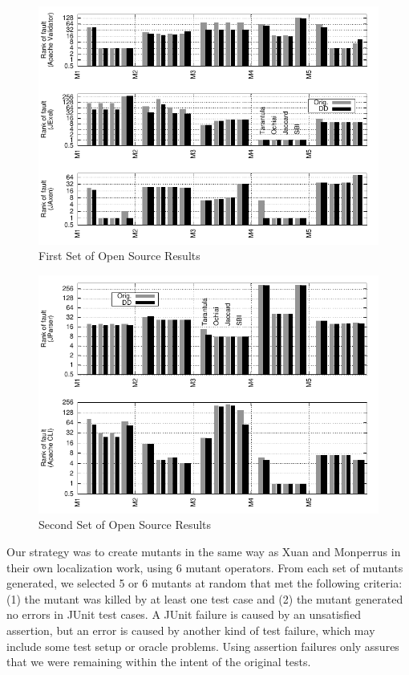 \begin{figure}[t]
  \centering
  \includegraphics[width=\columnwidth]{opensource1}
  \caption{First Set of Open Source Results}
  \label{fig:opensource1}
\end{figure}

\begin{figure}[t]
  \centering
  \includegraphics[width=\columnwidth]{opensource2}
  \caption{Second Set of Open Source Results}
  \label{fig:opensource2}
\end{figure}

 
Our strategy was to create mutants in the same way as Xuan and
Monperrus \cite{PureTest} in their own localization work, using 6
mutant operators.  From each set of mutants generated, we selected 5
or 6 mutants at random that met the following criteria: (1) the mutant
was killed by at least one test case and (2) the mutant generated no
errors in JUnit test cases.  A JUnit failure is caused by an
unsatisfied assertion, but an error is caused by another kind of test
failure, which may include some test setup or oracle problems.  Using
assertion failures only assures that we were remaining within the
intent of the original tests.

